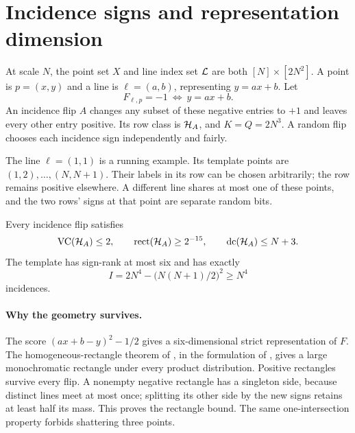 \section{Incidence signs and representation dimension}\label{sec:incidence}
At scale $N$, the point set $X$ and line index set $\mathcal L$ are both $[N]\times[2N^2]$. A point is $p=(x,y)$ and a line is $\ell=(a,b)$, representing $y=ax+b$. Let
\begin{equation}
 F_{\ell,p}=-1\ \Longleftrightarrow\ y=ax+b.
 \label{eq:grid}
\end{equation}
An incidence flip $A$ changes any subset of these negative entries to $+1$ and leaves every other entry positive. Its row class is $\mathcal H_A$, and $K=Q=2N^3$. A random flip chooses each incidence sign independently and fairly.

The line $\ell=(1,1)$ is a running example. Its template points are $(1,2),\ldots,(N,N+1)$. Their labels in its row can be chosen arbitrarily; the row remains positive elsewhere. A different line shares at most one of these points, and the two rows' signs at that point are separate random bits.



\begin{proposition}\label{prop:geometry}
Every incidence flip satisfies
\begin{equation}
 \operatorname{VC}(\mathcal H_A)\le2,\qquad \operatorname{rect}(\mathcal H_A)\ge2^{-15},\qquad \operatorname{dc}(\mathcal H_A)\le N+3.
 \label{eq:geometry}
\end{equation}
The template has sign-rank at most six and has exactly
\begin{equation}
 I=2N^4-\bigl(N(N+1)/2\bigr)^2\ge N^4
 \label{eq:incidencecount}
\end{equation}
incidences.
\end{proposition}

\paragraph{Why the geometry survives.}
The score $(ax+b-y)^2-1/2$ gives a six-dimensional strict representation of $F$. The homogeneous-rectangle theorem of \citet{APP05}, in the formulation of \citet[Theorem~1.9]{HHPTZ22}, gives a large monochromatic rectangle under every product distribution. Positive rectangles survive every flip. A nonempty negative rectangle has a singleton side, because distinct lines meet at most once; splitting its other side by the new signs retains at least half its mass. This proves the rectangle bound. The same one-intersection property forbids shattering three points.

